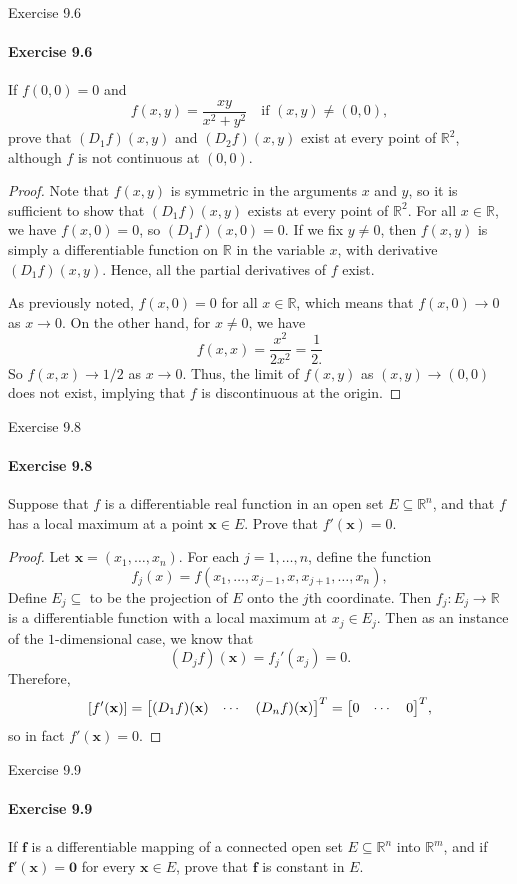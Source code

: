 \documentclass[12pt]{article}
\newenvironment{fullbox}{\begin{lrbox}{\savefullbox}\begin{minipage}{\dimexpr\textwidth-2\fboxsep\relax}}{\end{minipage}\end{lrbox}\begin{center}\framebox[\textwidth]{\usebox{\savefullbox}}\end{center}}
\newenvironment{pbox}[1][]{\begin{fullbox}\ifx#1\empty\else\paragraph{#1}\fi}{\end{fullbox}}
\theoremstyle{definition}
\newcommand{\R}{\mathbb{R}}
\newcommand{\bm}{\mathbf}
\newcommand{\x}{\mathbf{x}}
\begin{document}
\begin{pbox}[Exercise 9.6]
    If $f(0, 0) = 0$ and
    \[
        f(x, y) = \frac{xy}{x^2 + y^2} \quad \text{if } (x, y) \ne (0, 0),
    \]
    prove that $(D_1f)(x, y)$ and $(D_2f)(x, y)$ exist at every point of $\R^2$, although $f$ is not continuous at $(0, 0)$.
\end{pbox}

\begin{proof}
    Note that $f(x, y)$ is symmetric in the arguments $x$ and $y$, so it is sufficient to show that $(D_1f)(x, y)$ exists at every point of $\R^2$. For all $x \in \R$, we have $f(x, 0) = 0$, so $(D_1f)(x, 0) = 0$. If we fix $y \ne 0$, then $f(x, y)$ is simply a differentiable function on $\R$ in the variable $x$, with derivative $(D_1f)(x, y)$. Hence, all the partial derivatives of $f$ exist.

    As previously noted, $f(x, 0) = 0$ for all $x \in \R$, which means that $f(x, 0) \to 0$ as $x \to 0$. On the other hand, for $x \ne 0$, we have
    \[
        f(x, x) = \frac{x^2}{2x^2} = \frac{1}{2.}
    \]
    So $f(x, x) \to 1/2$ as $x \to 0$. Thus, the limit of $f(x, y)$ as $(x, y) \to (0, 0)$ does not exist, implying that $f$ is discontinuous at the origin.

\end{proof}




\begin{pbox}[Exercise 9.8]
    Suppose that $f$ is a differentiable real function in an open set $E \subseteq \R^n$, and that $f$ has a local maximum at a point $\x \in E$. Prove that $f'(\x) = 0$.
\end{pbox}

\begin{proof}
    Let $\x = (x_1, \dots, x_n)$. For each $j = 1, \dots, n$, define the function
    \[
        f_j(x) = f(x_1, \dots, x_{j-1}, x, x_{j+1}, \dots, x_n),
    \]
    Define $E_j \subseteq $ to be the projection of $E$ onto the $j$th coordinate. Then $f_j : E_j \to \R$ is a differentiable function with a local maximum at $x_j \in E_j$. Then as an instance of the $1$-dimensional case, we know that 
    \[
        (D_jf)(\x) = f_j'(x_j) = 0.
    \]
    Therefore,
    \[
        [f'(\x)] = \mqty[(D_1f)(\x) & \cdots & (D_nf)(\x)]^T = \mqty[0 & \cdots & 0]^T,
    \]
    so in fact $f'(\x) = 0$.

\end{proof}




\newpage
\begin{pbox}[Exercise 9.9]
    If $\bm{f}$ is a differentiable mapping of a connected open set $E \subseteq \R^n$ into $\R^m$, and if $\bm{f}'(\x) = \bm{0}$ for every $\x \in E$, prove that $\bm{f}$ is constant in $E$.
\end{pbox}
\end{document}
